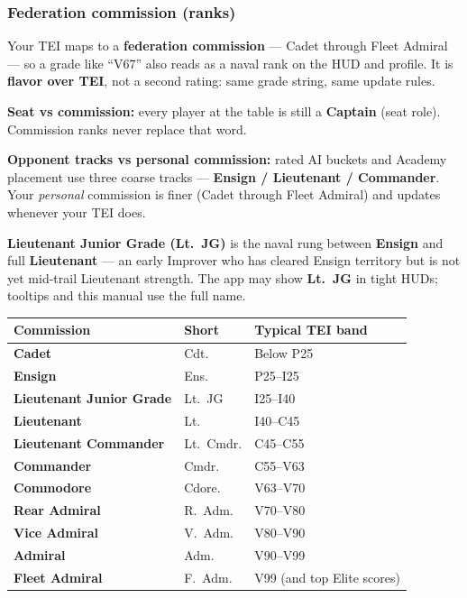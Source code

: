 \documentclass[11pt]{article}
\begin{document}
\subsubsection{Federation commission
(ranks)}\label{federation-commission-ranks}

Your TEI maps to a \textbf{federation commission} --- Cadet through Fleet
Admiral --- so a grade like ``V67'' also reads as a naval rank on the HUD
and profile. It is \textbf{flavor over TEI}, not a second rating: same
grade string, same update rules.

\textbf{Seat vs commission:} every player at the table is still a
\textbf{Captain} (seat role). Commission ranks never replace that word.

\textbf{Opponent tracks vs personal commission:} rated AI buckets and
Academy placement use three coarse tracks --- \textbf{Ensign /
Lieutenant / Commander}. Your \emph{personal} commission is finer
(Cadet through Fleet Admiral) and updates whenever your TEI does.

\textbf{Lieutenant Junior Grade (Lt.~JG)} is the naval rung between
\textbf{Ensign} and full \textbf{Lieutenant} --- an early Improver who
has cleared Ensign territory but is not yet mid-trail Lieutenant
strength. The app may show \textbf{Lt.~JG} in tight HUDs; tooltips and
this manual use the full name.

\begin{longtable}[]{@{}lll@{}}
\toprule\noalign{}
Commission & Short & Typical TEI band \\
\midrule\noalign{}
\endhead
\bottomrule\noalign{}
\endlastfoot
\textbf{Cadet} & Cdt. & Below P25 \\
\textbf{Ensign} & Ens. & P25--I25 \\
\textbf{Lieutenant Junior Grade} & Lt.~JG & I25--I40 \\
\textbf{Lieutenant} & Lt. & I40--C45 \\
\textbf{Lieutenant Commander} & Lt.~Cmdr. & C45--C55 \\
\textbf{Commander} & Cmdr. & C55--V63 \\
\textbf{Commodore} & Cdore. & V63--V70 \\
\textbf{Rear Admiral} & R.~Adm. & V70--V80 \\
\textbf{Vice Admiral} & V.~Adm. & V80--V90 \\
\textbf{Admiral} & Adm. & V90--V99 \\
\textbf{Fleet Admiral} & F.~Adm. & V99 (and top Elite scores) \\
\end{longtable}
\end{document}
